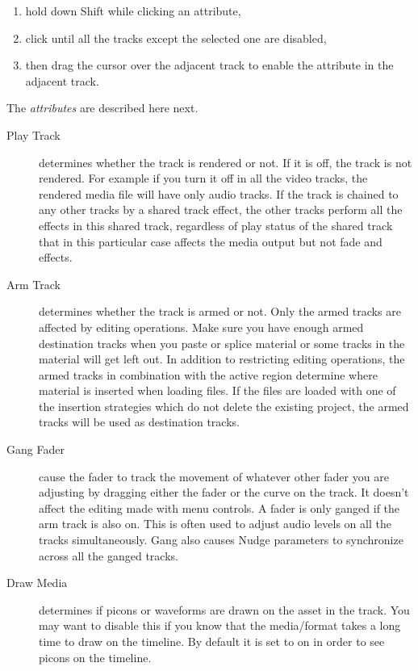 \begin{enumerate}
    \item hold down Shift while clicking an attribute,
    \item click until all the tracks except the selected one are disabled,
    \item then drag the cursor over the adjacent track to enable the attribute in the adjacent track.
\end{enumerate}

The \textit{attributes} are described here next.

\begin{description}
    \item[Play Track] determines whether the track is rendered or not. If it is off, the track is not rendered.  For example if you turn it off in all the video tracks, the rendered media file will have only audio tracks.  If the track is chained to any other tracks by a shared track effect, the other tracks perform all the effects in this shared track, regardless of play status of the shared track that in this particular case affects the media output but not fade and effects.
    \item[Arm Track] determines whether the track is armed or not.  Only the armed tracks are affected by editing operations. Make sure you have enough armed destination tracks when you paste or splice material or some tracks in the material will get left out.  In addition to restricting editing operations, the armed tracks in combination with the active region determine where material is inserted when loading files.  If the files are loaded with one of the insertion strategies which do not delete the existing project, the armed  tracks will be used as destination tracks.
    \item[Gang Fader] cause the fader to track the movement of whatever other fader you are adjusting by dragging either the fader or the curve on the track.  It doesn't affect the editing made with menu controls.  A fader is only ganged if the arm track is also on.  This is often used to adjust audio levels on all the tracks simultaneously.  Gang also causes Nudge parameters to synchronize across all the ganged tracks.
    \item[Draw Media] determines if picons or waveforms are drawn on the asset in the track.  You may want to disable this if you know that the media/format takes a long time to draw on the timeline.  By default it is set to on in order to see picons on the timeline.

\end{description}
